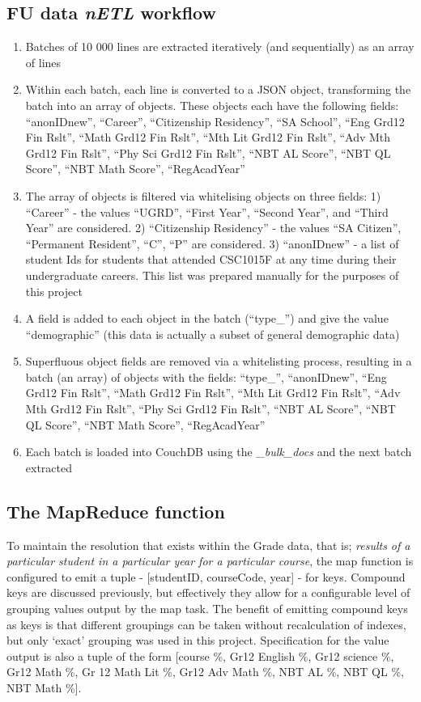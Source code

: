 \subsection*{FU data \textit{nETL} workflow}
\begin{enumerate}
    \item Batches of 10 000 lines are extracted iteratively (and sequentially) as an array of lines
    \item Within each batch, each line is converted to a JSON object, transforming the batch into an array of objects. These objects each have the following fields: ``anonIDnew'', ``Career'', ``Citizenship Residency'', ``SA School'', ``Eng Grd12 Fin Rslt'', ``Math Grd12 Fin Rslt'', ``Mth Lit Grd12 Fin Rslt'', ``Adv Mth Grd12 Fin Rslt'', ``Phy Sci Grd12 Fin Rslt'', ``NBT AL Score'', ``NBT QL Score'', ``NBT Math Score'', ``RegAcadYear''
    \item The array of objects is filtered via whitelising objects on three fields: 1) ``Career'' - the values ``UGRD'', ``First Year'', ``Second Year'', and ``Third Year'' are considered. 2) ``Citizenship Residency'' - the values ``SA Citizen'', ``Permanent Resident'', ``C'', ``P'' are considered. 3) ``anonIDnew'' - a list of student Ids for students that attended CSC1015F at any time during their undergraduate careers. This list was prepared manually for the purposes of this project
    \item A field is added to each object in the batch (``type_'') and give the value ``demographic'' (this data is actually a subset of general demographic data)
    \item Superfluous object fields are removed via a whitelisting process, resulting in a batch (an array) of objects with the fields: ``type_'', ``anonIDnew'', ``Eng Grd12 Fin Rslt'', ``Math Grd12 Fin Rslt'', ``Mth Lit Grd12 Fin Rslt'', ``Adv Mth Grd12 Fin Rslt'', ``Phy Sci Grd12 Fin Rslt'', ``NBT AL Score'', ``NBT QL Score'', ``NBT Math Score'', ``RegAcadYear''
    \item Each batch is loaded into CouchDB using the \textit{\_bulk\_docs} and the next batch extracted
\end{enumerate}

\subsection*{The MapReduce function}
To maintain the resolution that exists within the Grade data, that is; \textit{results of a particular student in a particular year for a particular course}, the map function is configured to emit a tuple - [studentID, courseCode, year] - for keys. Compound keys are discussed previously, but effectively they allow for a configurable level of grouping values output by the map task. The benefit of emitting compound keys as keys is that different groupings can be taken without recalculation of indexes, but only `exact' grouping was used in this project. Specification for the value output is also a tuple of the form [course \%, Gr12 English \%, Gr12 science \%, Gr12 Math \%, Gr 12 Math Lit \%, Gr12 Adv Math \%, NBT AL \%, NBT QL \%, NBT Math \%].

